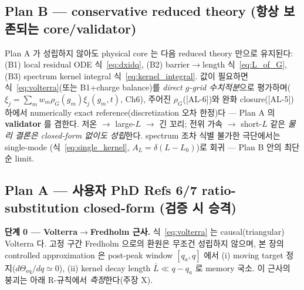 \documentclass[11pt,a4paper]{article}
\newcommand{\eq}{\mathrm{eq}}
\newcommand{\AL}[1]{\textsf{[AL-#1]}}
\begin{document}
\subsection{Plan B — conservative reduced theory (항상 보존되는 core/validator)}\label{sec:planB}
Plan A 가 성립하지 않아도 physical core 는 다음 reduced theory 만으로 유지된다: (B1) local residual
ODE 식~\eqref{eq:dxidq}, (B2) barrier$\to$length 식~\eqref{eq:L_of_G}, (B3) spectrum kernel integral
식~\eqref{eq:kernel_integral}. 값이 필요하면 식~\eqref{eq:volterra}(또는 B1+charge balance)를
\emph{direct $g$-grid 수치적분}으로 평가하며($\xi_j=\sum_m w_m\rho_G(g_m)\xi_j(g_m,t)$, Ch6), 주어진
$\rho_G$(\AL{6})와 완화 closure(\AL{5}) 하에서 numerically exact reference(discretization 오차 한정)다 —
Plan A 의 \textbf{validator} 를 겸한다. 저온 $\to$ large-$L$ $\to$ 긴 꼬리; 전위 가속 $\to$ short-$L$
같은 \emph{물리 결론은 closed-form 없이도 성립}한다. spectrum 조차 식별 불가한 극단에서는 single-mode
(식~\eqref{eq:single_kernel}, $A_L=\delta(L-L_0)$)로 회귀 — Plan B 안의 최단순 limit.

\subsection{Plan A — 사용자 PhD Refs 6/7 ratio-substitution closed-form (검증 시 승격)}\label{sec:planA}
\textbf{단계 0 — Volterra$\to$Fredholm 근사.} 식~\eqref{eq:volterra} 는 causal(triangular) Volterra 다.
고정 구간 Fredholm 으로의 환원은 무조건 성립하지 않으며, 본 장의 controlled approximation 은 post-peak
window $[q_a,q]$ 에서 (i) moving target 정지($d\Theta_\eq/dq\simeq0$), (ii) kernel decay length
$\bar L\ll q-q_a$ 로 memory 국소. 이 근사의 붕괴는 아래 R-규칙에서 \emph{측정}한다(주장 X).
\end{document}
